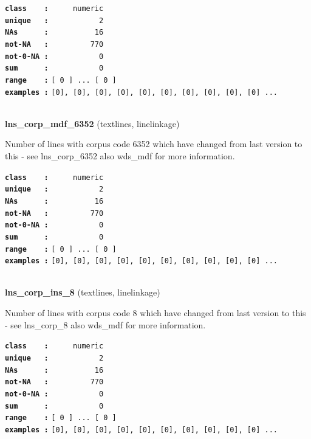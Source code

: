 \documentclass[]{article}
\begin{document}
\textbf{\texttt{class\ \ \ \ :}} \texttt{~~~~~numeric}\\
\textbf{\texttt{unique\ \ \ :}} \texttt{~~~~~~~~~~~2}\\
\textbf{\texttt{NAs\ \ \ \ \ \ :}} \texttt{~~~~~~~~~~16}\\
\textbf{\texttt{not-NA\ \ \ :}} \texttt{~~~~~~~~~770}\\
\textbf{\texttt{not-0-NA\ :}} \texttt{~~~~~~~~~~~0}\\
\textbf{\texttt{sum\ \ \ \ \ \ :}} \texttt{~~~~~~~~~~~0}\\
\textbf{\texttt{range\ \ \ \ :}}
\texttt{{[}\ 0\ {]}\ ...\ {[}\ 0\ {]}}\\
\textbf{\texttt{examples\ :}}
\texttt{{[}0{]},\ {[}0{]},\ {[}0{]},\ {[}0{]},\ {[}0{]},\ {[}0{]},\ {[}0{]},\ {[}0{]},\ {[}0{]},\ {[}0{]}\ ...}\\

~

\textbf{lns\_corp\_mdf\_6352} (textlines, linelinkage)

Number of lines with corpus code 6352 which have changed from last
version to this - see lns\_corp\_6352 also wds\_mdf for more
information.

\textbf{\texttt{class\ \ \ \ :}} \texttt{~~~~~numeric}\\
\textbf{\texttt{unique\ \ \ :}} \texttt{~~~~~~~~~~~2}\\
\textbf{\texttt{NAs\ \ \ \ \ \ :}} \texttt{~~~~~~~~~~16}\\
\textbf{\texttt{not-NA\ \ \ :}} \texttt{~~~~~~~~~770}\\
\textbf{\texttt{not-0-NA\ :}} \texttt{~~~~~~~~~~~0}\\
\textbf{\texttt{sum\ \ \ \ \ \ :}} \texttt{~~~~~~~~~~~0}\\
\textbf{\texttt{range\ \ \ \ :}}
\texttt{{[}\ 0\ {]}\ ...\ {[}\ 0\ {]}}\\
\textbf{\texttt{examples\ :}}
\texttt{{[}0{]},\ {[}0{]},\ {[}0{]},\ {[}0{]},\ {[}0{]},\ {[}0{]},\ {[}0{]},\ {[}0{]},\ {[}0{]},\ {[}0{]}\ ...}\\

~

\textbf{lns\_corp\_ins\_8} (textlines, linelinkage)

Number of lines with corpus code 8 which have changed from last version
to this - see lns\_corp\_8 also wds\_mdf for more information.

\textbf{\texttt{class\ \ \ \ :}} \texttt{~~~~~numeric}\\
\textbf{\texttt{unique\ \ \ :}} \texttt{~~~~~~~~~~~2}\\
\textbf{\texttt{NAs\ \ \ \ \ \ :}} \texttt{~~~~~~~~~~16}\\
\textbf{\texttt{not-NA\ \ \ :}} \texttt{~~~~~~~~~770}\\
\textbf{\texttt{not-0-NA\ :}} \texttt{~~~~~~~~~~~0}\\
\textbf{\texttt{sum\ \ \ \ \ \ :}} \texttt{~~~~~~~~~~~0}\\
\textbf{\texttt{range\ \ \ \ :}}
\texttt{{[}\ 0\ {]}\ ...\ {[}\ 0\ {]}}\\
\textbf{\texttt{examples\ :}}
\texttt{{[}0{]},\ {[}0{]},\ {[}0{]},\ {[}0{]},\ {[}0{]},\ {[}0{]},\ {[}0{]},\ {[}0{]},\ {[}0{]},\ {[}0{]}\ ...}\\
\end{document}
